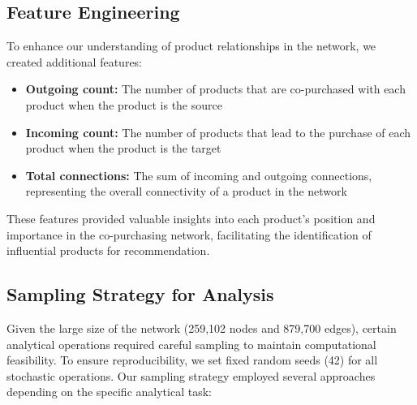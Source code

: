 \documentclass[conference]{IEEEtran}
\begin{document}
\subsection{Feature Engineering}
To enhance our understanding of product relationships in the network, we created additional features:

\begin{itemize}
    \item \textbf{Outgoing count:} The number of products that are co-purchased with each product when the product is the source
    \item \textbf{Incoming count:} The number of products that lead to the purchase of each product when the product is the target
    \item \textbf{Total connections:} The sum of incoming and outgoing connections, representing the overall connectivity of a product in the network
\end{itemize}

These features provided valuable insights into each product's position and importance in the co-purchasing network, facilitating the identification of influential products for recommendation.

\subsection{Sampling Strategy for Analysis}
\label{sec:sampling}
Given the large size of the network (259,102 nodes and 879,700 edges), certain analytical operations required careful sampling to maintain computational feasibility. To ensure reproducibility, we set fixed random seeds (42) for all stochastic operations. Our sampling strategy employed several approaches depending on the specific analytical task:
\end{document}
